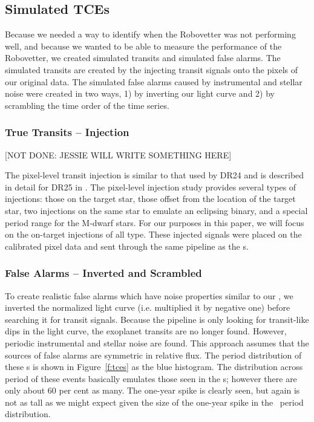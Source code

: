 \subsection{Simulated TCEs}
\label{s:simulated}
Because we needed a way to identify when the Robovetter was not performing well, and because we wanted to be able to measure the performance of the Robovetter, we created simulated transits and simulated false alarms. The simulated transits are created by the injecting transit signals onto the pixels of our original data.  The simulated false alarms caused by instrumental and stellar noise were created in two ways, 1) by inverting our light curve and 2) by scrambling the time order of the time series.  


\subsubsection{True Transits -- Injection}
\label{injectsec}
[NOT DONE: JESSIE WILL WRITE SOMETHING HERE\newline]

The pixel-level transit injection is similar to that used by DR24 \citep{Christiansen2016} and is described in detail for DR25 in \citep{Christiansen2017}. The pixel-level injection study provides several types of injections: those on the target star, those offset from the location of the target star, two injections on the same star to emulate an eclipsing binary, and a special period range for the M-dwarf stars.  For our purposes in this paper, we will focus on the on-target injections of all type.  These injected signals were placed on the calibrated pixel data and sent through the same \Kepler{} pipeline as the \opstce s.


\subsubsection{False Alarms -- Inverted and Scrambled} 

To create realistic false alarms which have noise properties similar to our , we inverted the normalized light curve (i.e. multiplied it by negative one) before searching it for transit signals.  Because the pipeline is only looking for transit-like dips in the light curve, the exoplanet transits are no longer found. However, periodic instrumental and stellar noise are found. This approach assumes that the sources of false alarms are symmetric in relative flux. The period distribution of these \invtce s is shown in Figure~\ref{f:tces} as the blue histogram. 
The distribution across period of these events basically emulates those seen in the \opstce s; however there are only about 60 per cent as many.  The one-year spike is clearly seen, but again is not as tall as we might expect given the size of the one-year spike in the \opstce\ period distribution. 

